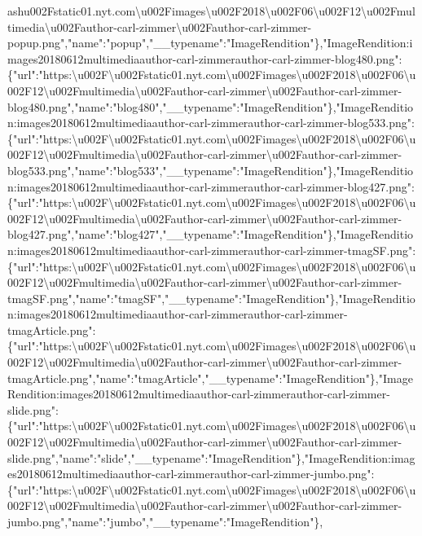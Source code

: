 ash{}u002Fstatic01.nyt.com\textbackslash{}u002Fimages\textbackslash{}u002F2018\textbackslash{}u002F06\textbackslash{}u002F12\textbackslash{}u002Fmultimedia\textbackslash{}u002Fauthor-carl-zimmer\textbackslash{}u002Fauthor-carl-zimmer-popup.png","name":"popup","\_\_typename":"ImageRendition"\},"ImageRendition:images20180612multimediaauthor-carl-zimmerauthor-carl-zimmer-blog480.png":\{"url":"https:\textbackslash{}u002F\textbackslash{}u002Fstatic01.nyt.com\textbackslash{}u002Fimages\textbackslash{}u002F2018\textbackslash{}u002F06\textbackslash{}u002F12\textbackslash{}u002Fmultimedia\textbackslash{}u002Fauthor-carl-zimmer\textbackslash{}u002Fauthor-carl-zimmer-blog480.png","name":"blog480","\_\_typename":"ImageRendition"\},"ImageRendition:images20180612multimediaauthor-carl-zimmerauthor-carl-zimmer-blog533.png":\{"url":"https:\textbackslash{}u002F\textbackslash{}u002Fstatic01.nyt.com\textbackslash{}u002Fimages\textbackslash{}u002F2018\textbackslash{}u002F06\textbackslash{}u002F12\textbackslash{}u002Fmultimedia\textbackslash{}u002Fauthor-carl-zimmer\textbackslash{}u002Fauthor-carl-zimmer-blog533.png","name":"blog533","\_\_typename":"ImageRendition"\},"ImageRendition:images20180612multimediaauthor-carl-zimmerauthor-carl-zimmer-blog427.png":\{"url":"https:\textbackslash{}u002F\textbackslash{}u002Fstatic01.nyt.com\textbackslash{}u002Fimages\textbackslash{}u002F2018\textbackslash{}u002F06\textbackslash{}u002F12\textbackslash{}u002Fmultimedia\textbackslash{}u002Fauthor-carl-zimmer\textbackslash{}u002Fauthor-carl-zimmer-blog427.png","name":"blog427","\_\_typename":"ImageRendition"\},"ImageRendition:images20180612multimediaauthor-carl-zimmerauthor-carl-zimmer-tmagSF.png":\{"url":"https:\textbackslash{}u002F\textbackslash{}u002Fstatic01.nyt.com\textbackslash{}u002Fimages\textbackslash{}u002F2018\textbackslash{}u002F06\textbackslash{}u002F12\textbackslash{}u002Fmultimedia\textbackslash{}u002Fauthor-carl-zimmer\textbackslash{}u002Fauthor-carl-zimmer-tmagSF.png","name":"tmagSF","\_\_typename":"ImageRendition"\},"ImageRendition:images20180612multimediaauthor-carl-zimmerauthor-carl-zimmer-tmagArticle.png":\{"url":"https:\textbackslash{}u002F\textbackslash{}u002Fstatic01.nyt.com\textbackslash{}u002Fimages\textbackslash{}u002F2018\textbackslash{}u002F06\textbackslash{}u002F12\textbackslash{}u002Fmultimedia\textbackslash{}u002Fauthor-carl-zimmer\textbackslash{}u002Fauthor-carl-zimmer-tmagArticle.png","name":"tmagArticle","\_\_typename":"ImageRendition"\},"ImageRendition:images20180612multimediaauthor-carl-zimmerauthor-carl-zimmer-slide.png":\{"url":"https:\textbackslash{}u002F\textbackslash{}u002Fstatic01.nyt.com\textbackslash{}u002Fimages\textbackslash{}u002F2018\textbackslash{}u002F06\textbackslash{}u002F12\textbackslash{}u002Fmultimedia\textbackslash{}u002Fauthor-carl-zimmer\textbackslash{}u002Fauthor-carl-zimmer-slide.png","name":"slide","\_\_typename":"ImageRendition"\},"ImageRendition:images20180612multimediaauthor-carl-zimmerauthor-carl-zimmer-jumbo.png":\{"url":"https:\textbackslash{}u002F\textbackslash{}u002Fstatic01.nyt.com\textbackslash{}u002Fimages\textbackslash{}u002F2018\textbackslash{}u002F06\textbackslash{}u002F12\textbackslash{}u002Fmultimedia\textbackslash{}u002Fauthor-carl-zimmer\textbackslash{}u002Fauthor-carl-zimmer-jumbo.png","name":"jumbo","\_\_typename":"ImageRendition"\},